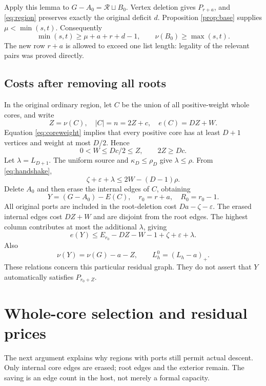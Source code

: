 \documentclass[11pt,a4paper]{article}
\theoremstyle{definition}
\begin{document}
Apply this lemma to $G-A_0=\mathcal R\sqcup B_0$. Vertex deletion gives $P_{r+a}$, and \eqref{eq:region} preserves exactly the original deficit $d$. Proposition \ref{prop:base} supplies $\mu<\min(s,t)$. Consequently
\begin{equation}\label{eq:stronglength}
\min(s,t)\ge\mu+a+r+d-1,
\qquad \nu(B_0)\ge\max(s,t).
\end{equation}
The new row $r+a$ is allowed to exceed one list length: legality of the relevant pairs was proved directly.

\subsection{Costs after removing all roots}
In the original ordinary region, let $C$ be the union of all positive-weight whole cores, and write
\[
Z=\nu(C),\quad |C|=n=2Z+c,\quad e(C)=DZ+W.
\]
Equation \eqref{eq:coreweight} implies that every positive core has at least $D+1$ vertices and weight at most $D/2$. Hence
\begin{equation}\label{eq:corecaps}
0<W\le Dc/2\le Z,\qquad 2Z\ge Dc.
\end{equation}
Let $\lambda=L_{D+1}$. The uniform source and $\kappa_D\le\rho_D$ give $\lambda\le\rho$. From \eqref{eq:handshake},
\begin{equation}\label{eq:rootdebt}
\zeta+\varepsilon+\lambda\le2W-(D-1)\rho.
\end{equation}
Delete $A_0$ and then erase the internal edges of $C$, obtaining
\[
Y=(G-A_0)-E(C),\quad r_0=r+a,\quad R_0=r_0-1.
\]
All original ports are included in the root-deletion cost $Da-\zeta-\varepsilon$. The erased internal edges cost $DZ+W$ and are disjoint from the root edges. The highest column contributes at most the additional $\lambda$, giving
\begin{equation}\label{eq:Ycost}
e(Y)\le E_{r_0}-DZ-W-1+\zeta+\varepsilon+\lambda.
\end{equation}
Also
\[
\nu(Y)=\nu(G)-a-Z,\qquad L_h^0=(L_h-a)_+.
\]
These relations concern this particular residual graph. They do not assert that $Y$ automatically satisfies $P_{r_0+Z}$.


\section{Whole-core selection and residual prices}\label{sec:selector}
The next argument explains why regions with ports still permit actual descent. Only internal core edges are erased; root edges and the exterior remain. The saving is an edge count in the host, not merely a formal capacity.
\end{document}

